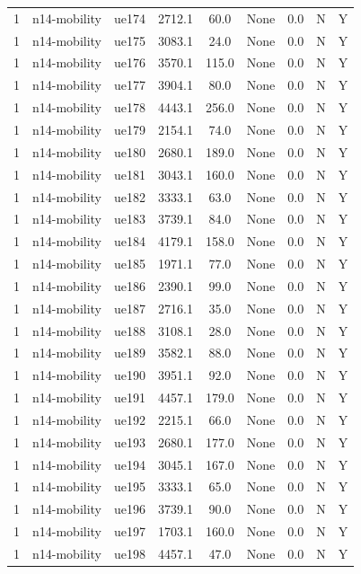 \begin{table}[ht]
\begin{tabular}{|c|c|c|c|c|c|c|c|c|}
1 & n14-mobility & ue174 & 2712.1 & 60.0 & None & 0.0 & N & Y \\
1 & n14-mobility & ue175 & 3083.1 & 24.0 & None & 0.0 & N & Y \\
1 & n14-mobility & ue176 & 3570.1 & 115.0 & None & 0.0 & N & Y \\
1 & n14-mobility & ue177 & 3904.1 & 80.0 & None & 0.0 & N & Y \\
1 & n14-mobility & ue178 & 4443.1 & 256.0 & None & 0.0 & N & Y \\
1 & n14-mobility & ue179 & 2154.1 & 74.0 & None & 0.0 & N & Y \\
1 & n14-mobility & ue180 & 2680.1 & 189.0 & None & 0.0 & N & Y \\
1 & n14-mobility & ue181 & 3043.1 & 160.0 & None & 0.0 & N & Y \\
1 & n14-mobility & ue182 & 3333.1 & 63.0 & None & 0.0 & N & Y \\
1 & n14-mobility & ue183 & 3739.1 & 84.0 & None & 0.0 & N & Y \\
1 & n14-mobility & ue184 & 4179.1 & 158.0 & None & 0.0 & N & Y \\
1 & n14-mobility & ue185 & 1971.1 & 77.0 & None & 0.0 & N & Y \\
1 & n14-mobility & ue186 & 2390.1 & 99.0 & None & 0.0 & N & Y \\
1 & n14-mobility & ue187 & 2716.1 & 35.0 & None & 0.0 & N & Y \\
1 & n14-mobility & ue188 & 3108.1 & 28.0 & None & 0.0 & N & Y \\
1 & n14-mobility & ue189 & 3582.1 & 88.0 & None & 0.0 & N & Y \\
1 & n14-mobility & ue190 & 3951.1 & 92.0 & None & 0.0 & N & Y \\
1 & n14-mobility & ue191 & 4457.1 & 179.0 & None & 0.0 & N & Y \\
1 & n14-mobility & ue192 & 2215.1 & 66.0 & None & 0.0 & N & Y \\
1 & n14-mobility & ue193 & 2680.1 & 177.0 & None & 0.0 & N & Y \\
1 & n14-mobility & ue194 & 3045.1 & 167.0 & None & 0.0 & N & Y \\
1 & n14-mobility & ue195 & 3333.1 & 65.0 & None & 0.0 & N & Y \\
1 & n14-mobility & ue196 & 3739.1 & 90.0 & None & 0.0 & N & Y \\
1 & n14-mobility & ue197 & 1703.1 & 160.0 & None & 0.0 & N & Y \\
1 & n14-mobility & ue198 & 4457.1 & 47.0 & None & 0.0 & N & Y \\

\end{tabular}
\end{table}
